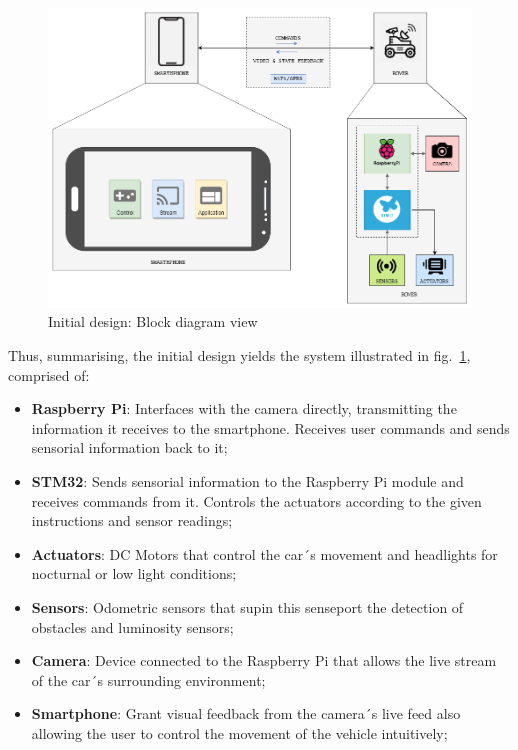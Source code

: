 \begin{figure}[!ht]
\centering
\includegraphics[width=1.0\textwidth]{./sec/img/initial_design_diagram.png}
\caption{\label{fig:initial-design}Initial design: Block diagram view}
\end{figure}

Thus, summarising, the initial design yields the system illustrated in
fig.~\ref{fig:initial-design}, comprised of:

\begin{itemize}
\item \textbf{ Raspberry Pi}: Interfaces with the camera directly, transmitting the information it receives to the smartphone. Receives user commands and sends sensorial information back to it;

\item \textbf{STM32}: Sends sensorial information to the Raspberry Pi module and receives commands from it. Controls the actuators according to the given instructions and sensor readings;

\item \textbf{Actuators}: DC Motors that control the car´s movement and headlights for nocturnal or low light conditions;

\item \textbf{Sensors}: Odometric sensors that supin this senseport the detection of obstacles and luminosity sensors;

\item \textbf{Camera}: Device connected to the Raspberry Pi that allows the live stream of the car´s surrounding environment;

\item \textbf{Smartphone}: Grant visual feedback from the camera´s live feed also allowing the user to control the movement of the vehicle intuitively;

\end{itemize}

